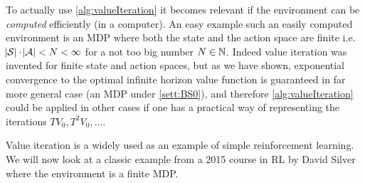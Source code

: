 To actually use \cref{alg:valueIteration} 
it becomes relevant if the environment can be \emph{computed}
efficiently (in a computer).
An easy example such an easily computed environment is
an MDP where both the state and the action space are finite i.e.
$\abs{\mathcal{S}} \cdot \abs{\mathcal{A}} < N < \infty$ for a not too big
number $N \in \mathbb{N}$.
Indeed value iteration was invented for finite state
and action spaces, but as we have shown, exponential convergence to the optimal
infinite horizon value function is guaranteed in far more general case
(an MDP under \cref{sett:BS0}), and therefore \cref{alg:valueIteration} could be
applied in other cases if one has a practical way of representing the iterations
$TV_0, T^2V_0, \dots$. 

Value iteration is a widely used as an example of simple
reinforcement learning.
We will now look at a classic example from a
2015 course in RL by David Silver where the environment is a
finite MDP.
